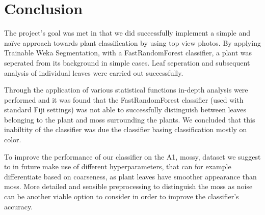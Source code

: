 \documentclass[paper=A4,bibliography=totocnumbered]{scrartcl}
\begin{document}
\section{Conclusion}
The project's goal was met in that we did successfully implement a simple and naïve approach towards plant classification by using top view photos. By applying Trainable Weka Segmentation, with a FastRandomForest classifier, a plant was seperated from its background in simple cases. Leaf seperation and subsequent analysis of individual leaves were carried out successfully. 

Through the application of various statistical functions in-depth analysis were performed and it was found that the FastRandomForest classifier (used with standard Fiji settings) was not able to successfully distinguish between leaves belonging to the plant and moss surrounding the plants. We concluded that this inabiltity of the classifier was due the classifier basing classification mostly on color. 

To improve the performance of our classifier on the A1, mossy, dataset we suggest to in future make use of different hyperparameters, that can for example differentiate based on coarseness, as plant leaves have smoother appearance than moss. More detailed and sensible preprocessing to distinguish the moss as noise can be another viable option to consider in order to improve the classifier's accuracy.


\renewcommand\bibname{References} %

\end{document}
